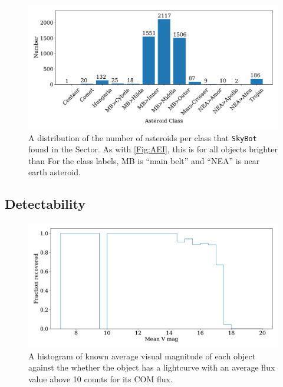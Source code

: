 \documentclass{UCreport}
\begin{document}
\begin{figure}
  \centering
  \includegraphics[width=\textwidth]{../OzData/classesBar29.pdf}
  \caption[Class distribution]{A distribution of the number of asteroids per class that \texttt{SkyBot} found in the Sector. 
  As with \autoref{Fig:AEI}, this is for all objects brighter than \unit{\mag}
  For the class labels, MB is ``main belt'' and ``NEA'' is near earth asteroid.}
  \label{Fig:NumPerClass}
\end{figure}

\subsection{Detectability}

\begin{figure}
  \centering
  \includegraphics[width=\textwidth]{../OzData/recoverdHistBkgLimof10.pdf}
  \caption[Recovery plot]{A histogram of known average visual magnitude of each object against the whether the object has a lightcurve with an average flux value above 10 %
  counts for its COM flux.
  }
  \label{Fig:RecovOverBkg}
\end{figure}
\end{document}
